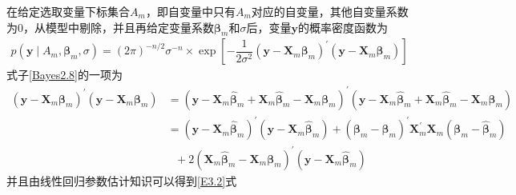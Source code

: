 \documentclass[12pt]{article} %
\begin{document}
	在给定选取变量下标集合$A_m$，即自变量中只有$A_m$对应的自变量，其他自变量系数为0，从模型中剔除，并且再给定变量系数$\boldsymbol{\beta}_{m}$和$\sigma$后，变量$\mathbf{y}$的概率密度函数为
	\begin{equation}
		\begin{aligned}
			p(\mathbf{y} \mid A_{m}, \boldsymbol{\beta}_{m},\sigma)=(2 \pi)^{-n / 2} \sigma^{-n} \times \exp \left[- \dfrac{1}{2\sigma^2}(\mathbf{y}-\mathbf{X}_m \boldsymbol{\beta}_{m})^\prime(\mathbf{y}-\mathbf{X}_m \boldsymbol{\beta}_{m})\right] \label{Bayes2.8}
		\end{aligned}
	\end{equation}
	式子\eqref{Bayes2.8}的一项为
	\begin{equation*}
		\begin{aligned}
			(\mathbf{y}-\mathbf{X}_m \boldsymbol{\beta}_{m})^\prime(\mathbf{y}-\mathbf{X}_m \boldsymbol{\beta}_{m})&=(\mathbf{y}-\mathbf{X}_m\hat{\boldsymbol{\beta}}_{m}+\mathbf{X}_m\hat{\boldsymbol{\beta}}_{m}-\mathbf{X}_m \boldsymbol{\beta}_{m})^\prime(\mathbf{y}-\mathbf{X}_m\hat{\boldsymbol{\beta}}_{m}+\mathbf{X}_m\hat{\boldsymbol{\beta}}_{m}-\mathbf{X}_m \boldsymbol{\beta}_{m}) \\
			&=(\mathbf{y}-\mathbf{X}_m\hat{\boldsymbol{\beta}}_{m})^{\prime}(\mathbf{y}-\mathbf{X}_m\hat{\boldsymbol{\beta}}_{m})+ (\boldsymbol{\beta}_{m}-\hat{\boldsymbol{\beta}}_{m})^{\prime} \mathbf{X}_{m}^{\prime} \mathbf{X}_{m}(\boldsymbol{\beta}_{m}-\hat{\boldsymbol{\beta}}_{m}) \\
			&~~~+2(\mathbf{X}_m\hat{\boldsymbol{\beta}}_{m}-\mathbf{X}_m \boldsymbol{\beta}_{m})^\prime(\mathbf{y}-\mathbf{X}_m\hat{\boldsymbol{\beta}}_{m})
		\end{aligned}
	\end{equation*}
	并且由线性回归参数估计知识可以得到\eqref{E3.2}式
	
\end{document}
